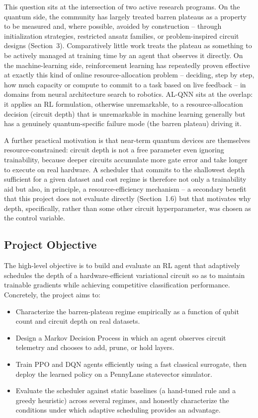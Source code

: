 This question sits at the intersection of two active research programs. On the quantum side, the community has largely treated barren plateaus as a property to be measured and, where possible, avoided by construction -- through initialization strategies, restricted ansatz families, or problem-inspired circuit designs (Section~3). Comparatively little work treats the plateau as something to be actively managed at training time by an agent that observes it directly. On the machine-learning side, reinforcement learning has repeatedly proven effective at exactly this kind of online resource-allocation problem -- deciding, step by step, how much capacity or compute to commit to a task based on live feedback -- in domains from neural architecture search to robotics. AL-QNN sits at the overlap: it applies an RL formulation, otherwise unremarkable, to a resource-allocation decision (circuit depth) that is unremarkable in machine learning generally but has a genuinely quantum-specific failure mode (the barren plateau) driving it.

A further practical motivation is that near-term quantum devices are themselves resource-constrained: circuit depth is not a free parameter even ignoring trainability, because deeper circuits accumulate more gate error and take longer to execute on real hardware. A scheduler that commits to the shallowest depth sufficient for a given dataset and cost regime is therefore not only a trainability aid but also, in principle, a resource-efficiency mechanism -- a secondary benefit that this project does not evaluate directly (Section~1.6) but that motivates why depth, specifically, rather than some other circuit hyperparameter, was chosen as the control variable.

\subsection{Project Objective}
The high-level objective is to build and evaluate an RL agent that adaptively schedules the depth of a hardware-efficient variational circuit so as to maintain trainable gradients while achieving competitive classification performance. Concretely, the project aims to:

\begin{itemize}
\item Characterize the barren-plateau regime empirically as a function of qubit count and circuit depth on real datasets.
\item Design a Markov Decision Process in which an agent observes circuit telemetry and chooses to add, prune, or hold layers.
\item Train PPO and DQN agents efficiently using a fast classical surrogate, then deploy the learned policy on a PennyLane statevector simulator.
\item Evaluate the scheduler against static baselines (a hand-tuned rule and a greedy heuristic) across several regimes, and honestly characterize the conditions under which adaptive scheduling provides an advantage.
\end{itemize}


